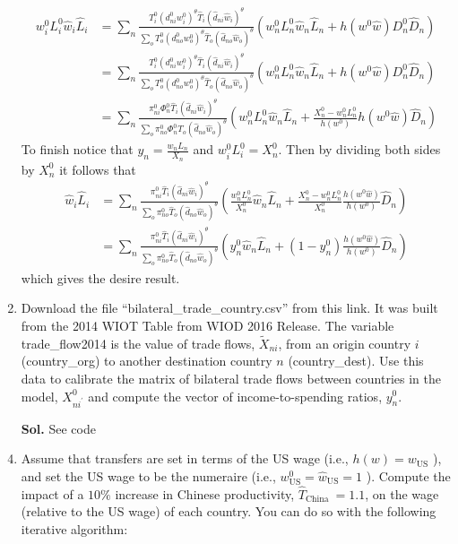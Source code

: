 \documentclass[12pt,oneside,reqno]{article}
\begin{document}
\begin{enumerate}[leftmargin=*, label=\textbf{(\roman*)}]
    \begin{align*}
        w^0_iL^0_i  \hat{w}_i\hat{L}_i &= \sum_{n}\frac{T_i^0\left(d_{ni}^0w_i^0\right)^\theta \hat{T}_i\left(\hat{d}_{ni}\hat{w}_i\right)^\theta}{\sum_{o}T_o^0\left(d_{no}^0w_o^0\right)^\theta \hat{T}_o\left(\hat{d}_{no}\hat{w}_o\right)^\theta}\left( w_n^0L_n^0\hat{w}_n\hat{L}_n +  h(w^0\hat{w})D_n^0\hat{D}_n\right) \\ 
        &= \sum_{n}\frac{T_i^0\left(d_{ni}^0w_i^0\right)^\theta \hat{T}_i\left(\hat{d}_{ni}\hat{w}_i\right)^\theta}{\sum_{o}T_o^0\left(d_{no}^0w_o^0\right)^\theta \hat{T}_o\left(\hat{d}_{no}\hat{w}_o\right)^\theta}\left( w_n^0L_n^0\hat{w}_n\hat{L}_n +  h(w^0\hat{w})D_n^0\hat{D}_n\right) \\ 
        &= \sum_{n}\frac{\pi_{ni}^0\Phi_n^0 \hat{T}_i\left(\hat{d}_{ni}\hat{w}_i\right)^\theta}{\sum_{o}\pi_{no}^0\Phi_n^0 \hat{T}_o\left(\hat{d}_{no}\hat{w}_o\right)^\theta}\left( w_n^0L_n^0\hat{w}_n\hat{L}_n +  \frac{X_n^0-w_n^0L_n^0}{h(w^0)}h(w^0\hat{w})\hat{D}_n\right)
    \end{align*}
    To finish notice that $y_n=\frac{w_nL_n}{X_n}$ and  $w^0_iL^0_i = X_n^0$. Then by dividing both sides by $X_n^0$ it follows that 
    \begin{align*}
        \hat{w}_i\hat{L}_i&= \sum_{n}\frac{\pi_{ni}^0 \hat{T}_i\left(\hat{d}_{ni}\hat{w}_i\right)^\theta}{\sum_{o}\pi_{no}^0\hat{T}_o\left(\hat{d}_{no}\hat{w}_o\right)^\theta}\left( \frac{w_n^0L_n^0}{X_n^0}\hat{w}_n\hat{L}_n +  \frac{X_n^0-w_n^0L_n^0}{X_n^0}\frac{h(w^0\hat{w})}{h(w^0)}\hat{D}_n\right) \\ 
        &= \sum_{n}\frac{\pi_{ni}^0 \hat{T}_i\left(\hat{d}_{ni}\hat{w}_i\right)^\theta}{\sum_{o}\pi_{no}^0\hat{T}_o\left(\hat{d}_{no}\hat{w}_o\right)^\theta}\left( y_n^0\hat{w}_n\hat{L}_n +  (1-y_n^0)\frac{h(w^0\hat{w})}{h(w^0)}\hat{D}_n\right)
    \end{align*}
    which gives the desire result. 
    \item Download the file ``bilateral\_trade\_country.csv'' from this link. It was built from the 2014 WIOT Table from WIOD 2016 Release. The variable trade\_flow2014 is the value of trade flows, $\tilde{X}_{n i}$, from an origin country $i$ (country\_org) to another destination country $n$ (country\_dest). Use this data to calibrate the matrix of bilateral trade flows between countries in the model, $X_{n i^{\prime}}^{0}$ and compute the vector of income-to-spending ratios, $y_{n}^{0}$.
    \item[\textbf{Sol.}] See code
    \item Assume that transfers are set in terms of the US wage (i.e., $h(w)=w_{\mathrm{US}}$ ), and set the US wage to be the numeraire (i.e., $w_{\mathrm{US}}^{0}=\hat{w}_{\mathrm{US}}=1$ ). Compute the impact of a $10 \%$ increase in Chinese productivity, $\hat{T}_{\text {China }}=1.1$, on the wage (relative to the US wage) of each country. You can do so with the following iterative algorithm:

\end{enumerate}
\end{document}
